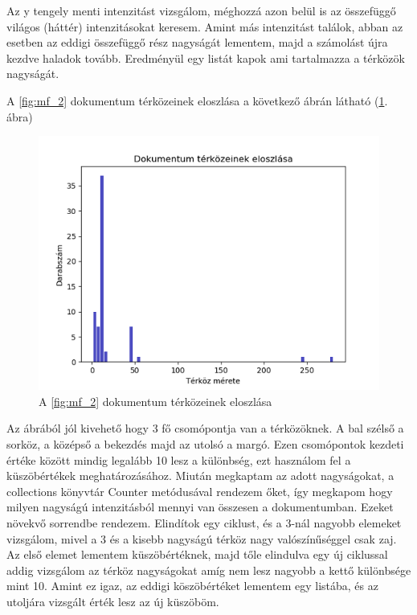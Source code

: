 Az y tengely menti intenzitást vizsgálom, méghozzá azon belül is az összefüggő világos (háttér) intenzitásokat keresem. Amint más intenzitást találok, abban az esetben az eddigi összefüggő rész nagyságát lementem, majd a számolást újra kezdve haladok tovább. Eredményül egy listát kapok ami tartalmazza a térközök nagyságát.

A \ref{fig:mf_2} dokumentum térközeinek eloszlása a következő ábrán látható (\ref{fig:spacing}. ábra)

\begin{figure}[H]
\centering
\includegraphics[scale=1]{images/spacing.png}
\caption{A \ref{fig:mf_2} dokumentum térközeinek eloszlása}
\label{fig:spacing}
\end{figure}

Az ábrából jól kivehető hogy 3 fő csomópontja van a térközöknek. A bal szélső a sorköz, a középső a bekezdés majd az utolsó a margó. Ezen csomópontok kezdeti értéke között mindig legalább 10 lesz a  különbség, ezt használom fel a küszöbértékek meghatározásához. Miután megkaptam az adott nagyságokat, a collections könyvtár Counter metódusával rendezem őket, így megkapom hogy milyen nagyságú intenzitásból mennyi van összesen a dokumentumban. Ezeket növekvő sorrendbe rendezem. Elindítok egy ciklust, és a 3-nál nagyobb elemeket vizsgálom, mivel a 3 és a kisebb nagyságú térköz nagy valószínűséggel csak zaj. Az első elemet lementem küszöbértéknek, majd tőle elindulva egy új ciklussal addig vizsgálom az térköz nagyságokat amíg nem lesz nagyobb a kettő különbsége mint 10. Amint ez igaz, az eddigi köszöbértéket lementem egy listába, és az utoljára vizsgált érték lesz az új küszöböm.

